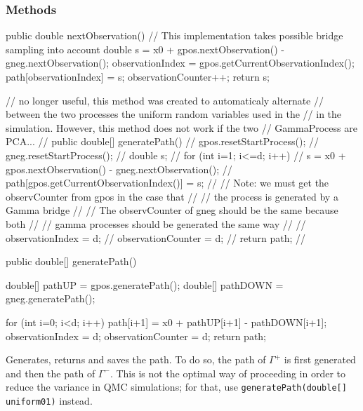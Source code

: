\subsubsection* {Methods}
\begin{code}\begin{hide}

   public double nextObservation() {
        // This implementation takes possible bridge sampling into account
        double s = x0 + gpos.nextObservation() - gneg.nextObservation();
        observationIndex = gpos.getCurrentObservationIndex();
        path[observationIndex] = s;
        observationCounter++;
        return s;
     }

// no longer useful, this method was created to automaticaly alternate
// between the two processes the uniform random variables used in the
// in the simulation.  However, this method does not work if the two
// GammaProcess are PCA...
//    public double[] generatePath()  {
//         gpos.resetStartProcess();
//         gneg.resetStartProcess();
//         double s;
//         for (int i=1; i<=d; i++) {
//            s = x0 + gpos.nextObservation() - gneg.nextObservation();
//            path[gpos.getCurrentObservationIndex()] = s;
//            // Note: we must get the observCounter from gpos in the case that
//            // the process is generated by a Gamma bridge
//            // The observCounter of gneg should be the same because both
//            // gamma processes should be generated the same way
//         }
//         observationIndex   = d;
//         observationCounter = d;
//         return path;
//     }
\end{hide}

   public double[] generatePath() \begin{hide} {
        double[] pathUP = gpos.generatePath();
        double[] pathDOWN = gneg.generatePath();

        for (int i=0; i<d; i++) {
           path[i+1] = x0 + pathUP[i+1] - pathDOWN[i+1];
        }
        observationIndex   = d;
        observationCounter = d;
        return path;
    }\end{hide}
\end{code}
\begin{tabb} Generates, returns and saves the path.  To do so, the
path of $\Gamma^{+}$ is first generated and then the path
of $\Gamma^{-}$.  This is not the optimal way of proceeding
in order to reduce the variance in QMC simulations; for that,
use \texttt{generatePath(double[] uniform01)} instead.
\end{tabb}
